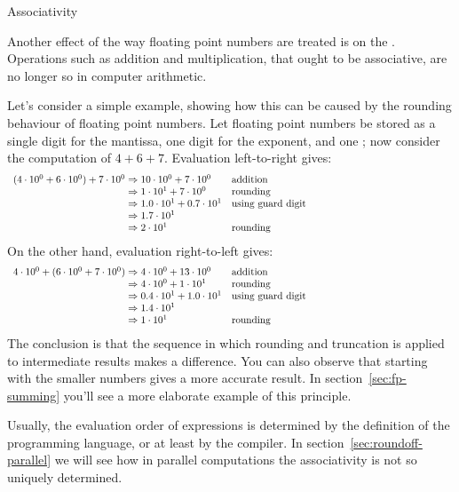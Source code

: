 \begin{comment}
Exercise: sine function through power series. How to deal with the
alternating signs?
\end{comment}

 {Associativity}
\label{sec:fp-associative}

Another effect of the way floating point numbers are treated
is on the .
Operations such as addition and multiplication, that ought to be
associative, are no longer so in computer arithmetic.

Let's consider a simple example, showing how this can be caused
by the rounding behaviour of floating point numbers.
Let floating point numbers be stored as a single digit for the mantissa,
one digit for the exponent, and one ;
now consider the computation of $4+6+7$.
Evaluation left-to-right gives:
\[ 
\begin{array}{l@{{}\Rightarrow{}}lp{3in}}
(4\cdot10^0 + 6\cdot10^0)+7\cdot10^0&10\cdot10^0+7\cdot10^0&addition\\
&1\cdot 10^1 + 7\cdot10^0&rounding\\
&1.0\cdot 10^1 + 0.7\cdot10^1&using guard digit\\
&1.7\cdot 10^1\\
&2\cdot10^1&rounding
\end{array}
\]
On the other hand, evaluation right-to-left gives:
\[ 
\begin{array}{l@{{}\Rightarrow{}}lp{3in}}
4\cdot10^0 + (6\cdot10^0 + 7\cdot10^0)&4\cdot 10^0 + 13\cdot10^0&addition\\
&4\cdot 10^0 + 1\cdot10^1&rounding\\
&0.4\cdot 10^1 + 1.0\cdot10^1&using guard digit\\
&1.4\cdot 10^1\\
&1\cdot10^1&rounding
\end{array}
\]
The conclusion is that the sequence in which rounding and truncation is applied to
intermediate results makes a difference. You can also observe that starting with the smaller
numbers gives a more accurate result.
In section~\ref{sec:fp-summing} you'll see a more elaborate example of this principle.

Usually, the evaluation order of expressions is determined by the definition of the
programming language, or at least by the compiler.
In section~\ref{sec:roundoff-parallel} we will see how in parallel computations the associativity
is not so uniquely determined.

